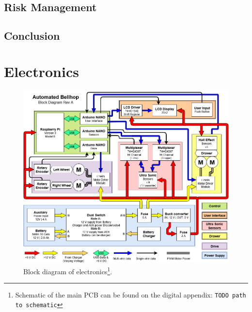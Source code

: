 \documentclass[11pt]{article}
\begin{document}
\subsection*{Risk Management}
\subsection*{Conclusion}


\newpage
\section{Electronics}
\begin{figure}[h]
  \centering
  \includegraphics[width=14cm]{block.png}
  \caption{Block diagram of electronics\footnote{Schematic of the main PCB can be found on the digital appendix: \texttt{TODO path to schematic}}.}
  \label{blockdiagram}
\end{figure}
\end{document}
